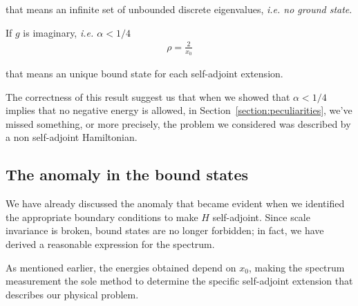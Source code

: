that means an infinite set of unbounded discrete eigenvalues, \textit{i.e. no ground state}.

\noindent
If $g$ is imaginary, \textit{i.e. $\alpha < 1/4$}
\begin{align*}
    \rho = \frac{2}{x_0}
\end{align*}

that means an unique bound state for each self-adjoint extension.

\vspace{4mm}
\noindent
The correctness of this result suggest us that when we showed that $\alpha < 1/4$ implies that no negative energy is allowed, in Section~\ref{section:peculiarities}, we've missed something, or more precisely, the problem we considered was described by a non self-adjoint Hamiltonian.

\subsection*{The anomaly in the bound states}

We have already discussed the anomaly that became evident when we identified the appropriate boundary conditions to make $H$ self-adjoint. Since scale invariance is broken, bound states are no longer forbidden; in fact, we have derived a reasonable expression for the spectrum.

\vspace{4mm}
\noindent
As mentioned earlier, the energies obtained depend on $x_0$, making the spectrum measurement the sole method to determine the specific self-adjoint extension that describes our physical problem.
